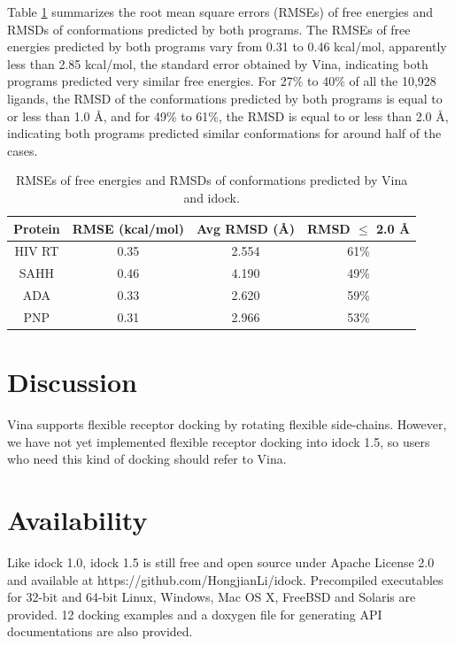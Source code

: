 \documentclass[10pt,conference,compsocconf]{../IEEEtran}
\begin{document}
Table \ref{tab:RMSEAndRMSD} summarizes the root mean square errors (RMSEs) of free energies and RMSDs of conformations predicted by both programs. The RMSEs of free energies predicted by both programs vary from 0.31 to 0.46 kcal/mol, apparently less than 2.85 kcal/mol, the standard error obtained by Vina, indicating both programs predicted very similar free energies. For 27\% to 40\% of all the 10,928 ligands, the RMSD of the conformations predicted by both programs is equal to or less than 1.0 \AA, and for 49\% to 61\%, the RMSD is equal to or less than 2.0 \AA, indicating both programs predicted similar conformations for around half of the cases.

\begin{table}
\centering
\begin{tabular*}
{\linewidth}
{@{\extracolsep{\fill}}cccc}
\toprule
Protein & RMSE (kcal/mol) & Avg RMSD (\AA) & RMSD $\leq$ 2.0 \AA\\
\midrule
HIV RT & 0.35 & 2.554 & 61\%\\
SAHH   & 0.46 & 4.190 & 49\%\\
ADA    & 0.33 & 2.620 & 59\%\\
PNP    & 0.31 & 2.966 & 53\%\\
\bottomrule
\end{tabular*}
\caption{RMSEs of free energies and RMSDs of conformations predicted by Vina and idock.}
\label{tab:RMSEAndRMSD}
\end{table}

\section{Discussion}

Vina supports flexible receptor docking by rotating flexible side-chains. However, we have not yet implemented flexible receptor docking into idock 1.5, so users who need this kind of docking should refer to Vina.

\section{Availability}

Like idock 1.0, idock 1.5 is still free and open source under Apache License 2.0 and available at https://github.com/HongjianLi/idock. Precompiled executables for 32-bit and 64-bit Linux, Windows, Mac OS X, FreeBSD and Solaris are provided. 12 docking examples and a doxygen file for generating API documentations are also provided.
\end{document}
